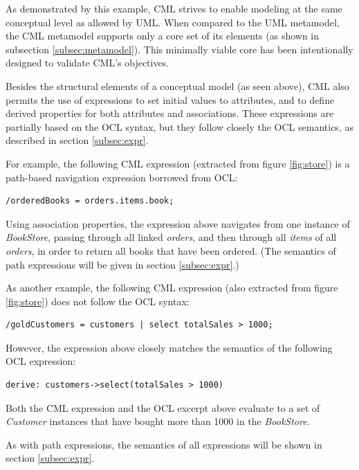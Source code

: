 As demonstrated by this example,
CML strives to enable modeling at the same conceptual level as allowed by UML.
When compared to the UML metamodel,
the CML metamodel supports only a core set of its elements (as shown in subsection \ref{subsec:metamodel}).
This minimally viable core has been intentionally designed to validate CML's objectives.

Besides the structural elements of a conceptual model (as seen above),
CML also permits the use of expressions to set initial values to attributes,
and to define derived properties for both attributes and associations.
These expressions are partially based on the OCL \cite{ocl} syntax,
but they follow closely the OCL semantics,
as described in section \ref{subsec:expr}.

For example, the following CML expression (extracted from figure \ref{fig:store}) is a path-based navigation expression borrowed from OCL:

\begin{verbatim}
/orderedBooks = orders.items.book;
\end{verbatim}

Using association properties, the expression above navigates from one instance of \emph{BookStore}, passing through all linked \emph{orders}, and then through all \emph{items} of all \emph{orders}, in order to return all books that have been ordered. (The semantics of path expressions will be given in section \ref{subsec:expr}.)

As another example,
the following CML expression (also extracted from figure \ref{fig:store}) does not follow the OCL syntax:

\begin{verbatim}
/goldCustomers = customers | select totalSales > 1000;
\end{verbatim}

However, the expression above closely matches the semantics of the following OCL expression:

\begin{verbatim}
derive: customers->select(totalSales > 1000)
\end{verbatim}

Both the CML expression and the OCL excerpt above evaluate to a set of \emph{Customer} instances
that have bought more than 1000 in the \emph{BookStore}. 

As with path expressions, the semantics of all expressions will be shown in section \ref{subsec:expr}.
 